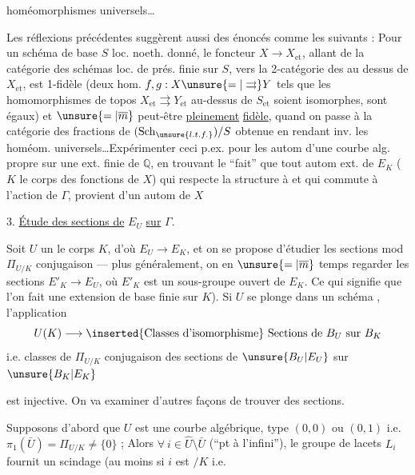 homéomorphismes universels\ldots

Les réflexions précédentes suggèrent aussi des énoncés comme les suivants : Pour un schéma de base $S$ loc. noeth. donné, le foncteur $X\longrightarrow X_{\mathrm{et}}$, allant de la catégorie  des schémas loc. de prés. finie sur $S$, vers la 2-catégorie des  au dessus de $X_{\mathrm{et}}$, est  1-fidèle (deux hom. $f,g:X\unsure{=|\rightrightarrows}Y$ tels que les homomorphismes de topos $X_{\mathrm{et}}\rightrightarrows Y_{\mathrm{et}}$ au-dessus de $S_{\mathrm{et}}$ soient isomorphes, sont égaux) et $\unsure{=|\overline m}$ peut-être \uline{pleinement} \uline{fidèle}, quand on passe à la catégorie des fractions de $(\mathrm{Sch}_{\unsure{l.t.f.}})/S$ obtenue en rendant inv. les homéom. universels\ldots Expérimenter  ceci p.ex. pour les autom d'une courbe alg. propre sur une ext. finie de $\mathbb{Q}$, en trouvant le ``fait'' que tout autom ext. de $E_K$ ($K$ le corps des fonctions de $X$) qui respecte la structure à  et qui commute à l'action de $\Gamma$, provient d'un autom de $X$

3. \uline{Étude des sections de} $E_U$ \uline{sur} $\Gamma$.

Soit $U$ un   le corps $K$, d'où $E_U\longrightarrow E_K$, et on se propose d'étudier les sections mod $\Pi_{U/K}$ conjugaison --- plus généralement, on  en $\unsure{=|\overline m}$ temps regarder les sections $E'_K\longrightarrow E_U$, où $E'_K$ est un sous-groupe ouvert de $E_K$. Ce qui signifie que l'on fait une extension de base finie sur $K$). Si  $U$ se plonge dans un schéma  , l'application
\[
U(K)\longrightarrow \inserted{\text{Classes d'isomorphisme}}\ \text{Sections de }B_U\text{ sur }B_K
\]
i.e. classes de $\Pi_{U/K}$ conjugaison des sections de $\unsure{B_U|E_U}$ sur $\unsure{B_K|E_K}$

est injective. On va examiner d'autres façons  de trouver des sections.

Supposons d'abord que $U$ est une courbe algébrique,   type $(0,0)$ ou $(0,1)$ i.e. $\pi_1(\bar U)=\Pi_{U/K}\ne\{0\}$ ; Alors  $\forall\ i\in\widehat U\setminus\bar U$ (``pt à l'infini''), le groupe de lacets $L_i$ fournit un scindage (au moins si $i$ est $/K$ i.e. 

